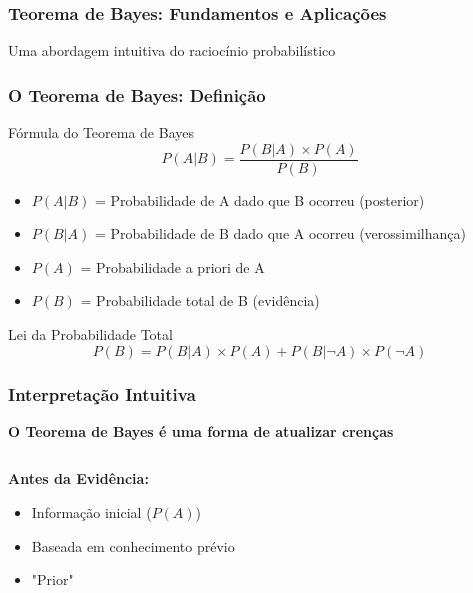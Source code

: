\documentclass[11pt]{beamer}
\begin{document}
\begin{frame}
{}
\begin{frame}
\frametitle{Teorema de Bayes: Fundamentos e Aplicações}
\begin{center}
\Large{Uma abordagem intuitiva do raciocínio probabilístico}
\end{center}
\end{frame}

\begin{frame}
\frametitle{O Teorema de Bayes: Definição}
\begin{block}{Fórmula do Teorema de Bayes}
\begin{equation*}
P(A|B) = \frac{P(B|A) \times P(A)}{P(B)}
\end{equation*}
\end{block}

\begin{itemize}
\item $P(A|B)$ = Probabilidade de A dado que B ocorreu (posterior)
\item $P(B|A)$ = Probabilidade de B dado que A ocorreu (verossimilhança)
\item $P(A)$ = Probabilidade a priori de A
\item $P(B)$ = Probabilidade total de B (evidência)
\end{itemize}

\begin{block}{Lei da Probabilidade Total}
\begin{equation*}
P(B) = P(B|A) \times P(A) + P(B|\neg A) \times P(\neg A)
\end{equation*}
\end{block}
\end{frame}

\begin{frame}
\frametitle{Interpretação Intuitiva}
\begin{center}
\textbf{O Teorema de Bayes é uma forma de atualizar crenças}
\end{center}

\begin{columns}
\begin{column}{0.48\textwidth}
\textbf{Antes da Evidência:}
\begin{itemize}
\item Informação inicial ($P(A)$)
\item Baseada em conhecimento prévio
\item "Prior"
\end{itemize}
\end{column}


\end{columns}
\end{frame}
\end{frame}
\end{document}
